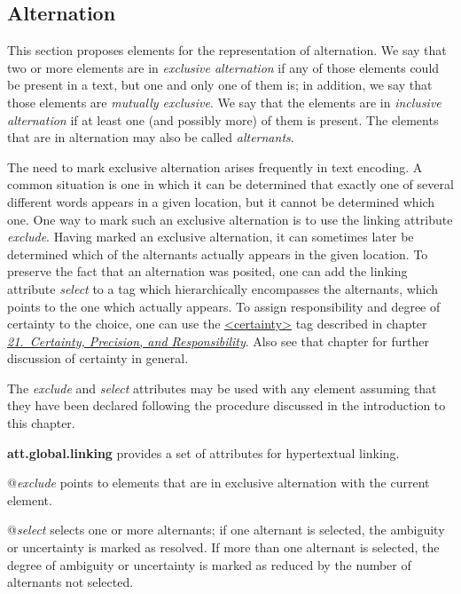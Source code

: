 \subsection[{Alternation}]{Alternation}\label{SAAT}\par
This section proposes elements for the representation of alternation. We say that two or more elements are in \textit{exclusive alternation} if any of those elements could be present in a text, but one and only one of them is; in addition, we say that those elements are \textit{mutually exclusive}. We say that the elements are in \textit{inclusive alternation} if at least one (and possibly more) of them is present. The elements that are in alternation may also be called \textit{alternants}.\par
The need to mark exclusive alternation arises frequently in text encoding. A common situation is one in which it can be determined that exactly one of several different words appears in a given location, but it cannot be determined which one. One way to mark such an exclusive alternation is to use the linking attribute {\itshape exclude}. Having marked an exclusive alternation, it can sometimes later be determined which of the alternants actually appears in the given location. To preserve the fact that an alternation was posited, one can add the linking attribute {\itshape select} to a tag which hierarchically encompasses the alternants, which points to the one which actually appears. To assign responsibility and degree of certainty to the choice, one can use the \hyperref[TEI.certainty]{<certainty>} tag described in chapter \textit{\hyperref[CE]{21.\ Certainty, Precision, and Responsibility}}. Also see that chapter for further discussion of certainty in general.\par
The {\itshape exclude} and {\itshape select} attributes may be used with any element assuming that they have been declared following the procedure discussed in the introduction to this chapter. 
\begin{sansreflist}
  
\item [\textbf{att.global.linking}] provides a set of attributes for hypertextual linking.\hfil\\[-10pt]\begin{sansreflist}
    \item[@{\itshape exclude}]
  points to elements that are in exclusive alternation with the current element.
    \item[@{\itshape select}]
  selects one or more alternants; if one alternant is selected, the ambiguity or uncertainty is marked as resolved. If more than one alternant is selected, the degree of ambiguity or uncertainty is marked as reduced by the number of alternants not selected.
\end{sansreflist}  
\end{sansreflist}
